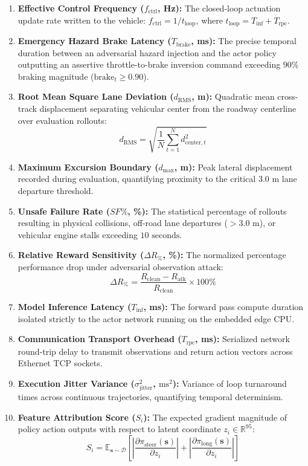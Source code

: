 \documentclass[conference]{IEEEtran}
\begin{document}
\begin{enumerate}
    \item \textbf{Effective Control Frequency ($f_{\text{ctrl}}$, Hz):} The closed-loop actuation update rate written to the vehicle: $f_{\text{ctrl}} = 1 / t_{\text{loop}}$, where $t_{\text{loop}} = T_{\text{inf}} + T_{\text{rpc}}$.
    \item \textbf{Emergency Hazard Brake Latency ($T_{\text{brake}}$, ms):} The precise temporal duration between an adversarial hazard injection and the actor policy outputting an assertive throttle-to-brake inversion command exceeding $90\%$ braking magnitude ($\text{brake}_t \ge 0.90$).
    \item \textbf{Root Mean Square Lane Deviation ($d_{\text{RMS}}$, m):} Quadratic mean cross-track displacement separating vehicular center from the roadway centerline over evaluation rollouts:
    \begin{equation}
        d_{\text{RMS}} = \sqrt{\frac{1}{N} \sum_{t=1}^N d_{\text{center}, t}^2}
    \end{equation}
    \item \textbf{Maximum Excursion Boundary ($d_{\max}$, m):} Peak lateral displacement recorded during evaluation, quantifying proximity to the critical $3.0\text{ m}$ lane departure threshold.
    \item \textbf{Unsafe Failure Rate ($SF\%$, \%):} The statistical percentage of rollouts resulting in physical collisions, off-road lane departures ($>3.0\text{ m}$), or vehicular engine stalls exceeding $10\text{ seconds}$.
    \item \textbf{Relative Reward Sensitivity ($\Delta R_\%$, \%):} The normalized percentage performance drop under adversarial observation attack:
    \begin{equation}
        \Delta R_\% = \frac{R_{\text{clean}} - R_{\text{atk}}}{R_{\text{clean}}} \times 100\%
    \end{equation}
    \item \textbf{Model Inference Latency ($T_{\text{inf}}$, ms):} The forward pass compute duration isolated strictly to the actor network running on the embedded edge CPU.
    \item \textbf{Communication Transport Overhead ($T_{\text{rpc}}$, ms):} Serialized network round-trip delay to transmit observations and return action vectors across Ethernet TCP sockets.
    \item \textbf{Execution Jitter Variance ($\sigma^2_{\text{jitter}}$, $\text{ms}^2$):} Variance of loop turnaround times across continuous trajectories, quantifying temporal determinism.
    \item \textbf{Feature Attribution Score ($S_i$):} The expected gradient magnitude of policy action outputs with respect to latent coordinate $z_i \in \mathbb{R}^{95}$:
    \begin{equation}
        S_i = \mathbb{E}_{\mathbf{s} \sim \mathcal{D}} \left[ \left| \frac{\partial \pi_{\text{steer}}(\mathbf{s})}{\partial z_i} \right| + \left| \frac{\partial \pi_{\text{long}}(\mathbf{s})}{\partial z_i} \right| \right]
    \end{equation}
\end{enumerate}
\end{document}
